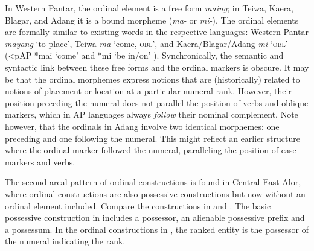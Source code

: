 \let\eachwordone=\itshape
\let\eachwordtwo=\upshape
\let\eachwordthree=\upshape
\let\eachwordfour=\upshape
\let\eachwordfive=\upshape 

In Western Pantar, the ordinal element is a free form \textit{maing}; in Teiwa, Kaera, Blagar, and Adang it is a bound morpheme (\textit{ma-} or \textit{mi-}). The ordinal elements are formally similar to existing words in the respective languages: Western Pantar \textit{mayang} `to place', Teiwa \textit{ma} `come, \textsc{obl}', and Kaera/Blagar/Adang \textit{mi} `\textsc{obl' (}{\textless}pAP *mai `come' and *mi `be in/on' \citealt{HoltonRobinsonTVhistory}). Synchronically, the semantic and syntactic link between these free forms and the ordinal markers is obscure. It may be that the ordinal morphemes express notions that are (historically) related to notions of placement or location at a particular numeral rank. However, their position preceding the numeral does not parallel the position of verbs and oblique markers, which in AP languages always \textit{follow} their nominal complement. Note however, that the ordinals in Adang involve two identical morphemes: one preceding and one following the numeral. This might reflect an earlier structure where the ordinal marker followed the numeral, paralleling the position of case markers and verbs.

The second areal pattern of ordinal constructions is found in Central-East Alor, where ordinal constructions are also possessive constructions but now without an ordinal element included. Compare the constructions in  and . The basic possessive construction in  includes a possessor, an alienable possessive prefix and a possessum. In the ordinal constructions in , the ranked entity is the possessor of the numeral indicating the rank.


\let\eachwordone=\itshape
\let\eachwordtwo=\itshape 


